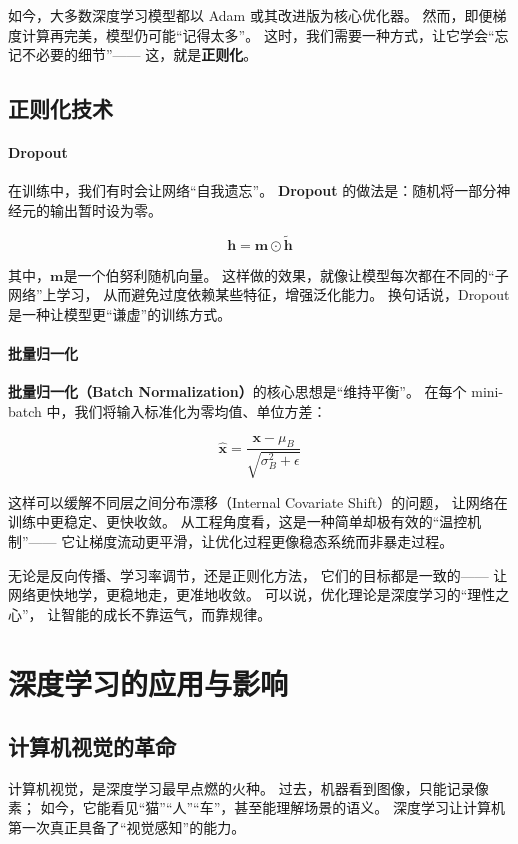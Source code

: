 如今，大多数深度学习模型都以 Adam 或其改进版为核心优化器。  
然而，即便梯度计算再完美，模型仍可能“记得太多”。  
这时，我们需要一种方式，让它学会“忘记不必要的细节”——  
这，就是\textbf{正则化}。

\subsection{正则化技术}

\paragraph{Dropout}  
在训练中，我们有时会让网络“自我遗忘”。  
\textbf{Dropout} 的做法是：随机将一部分神经元的输出暂时设为零。  

$$\mathbf{h} = \mathbf{m} \odot \tilde{\mathbf{h}}$$

其中，$\mathbf{m}$是一个伯努利随机向量。  
这样做的效果，就像让模型每次都在不同的“子网络”上学习，  
从而避免过度依赖某些特征，增强泛化能力。  
换句话说，Dropout 是一种让模型更“谦虚”的训练方式。  

\paragraph{批量归一化}  
\textbf{批量归一化（Batch Normalization）}的核心思想是“维持平衡”。  
在每个 mini-batch 中，我们将输入标准化为零均值、单位方差：  

$$\hat{\mathbf{x}} = \frac{\mathbf{x} - \mu_B}{\sqrt{\sigma_B^2 + \epsilon}}$$

这样可以缓解不同层之间分布漂移（Internal Covariate Shift）的问题，  
让网络在训练中更稳定、更快收敛。  
从工程角度看，这是一种简单却极有效的“温控机制”——  
它让梯度流动更平滑，让优化过程更像稳态系统而非暴走过程。

无论是反向传播、学习率调节，还是正则化方法，  
它们的目标都是一致的——  
让网络更快地学，更稳地走，更准地收敛。  
可以说，优化理论是深度学习的“理性之心”，  
让智能的成长不靠运气，而靠规律。

\section{深度学习的应用与影响}

\subsection{计算机视觉的革命}

计算机视觉，是深度学习最早点燃的火种。  
过去，机器看到图像，只能记录像素；  
如今，它能看见“猫”“人”“车”，甚至能理解场景的语义。  
深度学习让计算机第一次真正具备了“视觉感知”的能力。

